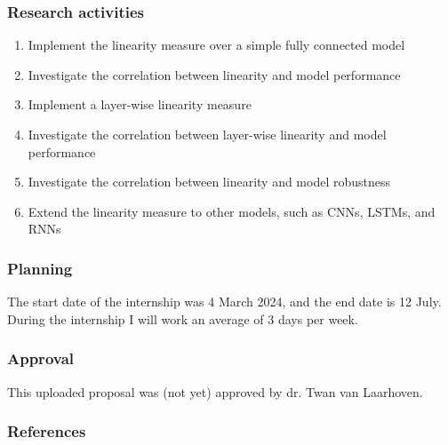 \documentclass[]{article}
\begin{document}
\subsubsection*{Research activities}
\begin{enumerate}
    \item Implement the linearity measure over a simple fully connected model
    \item Investigate the correlation between linearity and model performance
    \item Implement a layer-wise linearity measure
    \item Investigate the correlation between layer-wise linearity and model performance
    \item Investigate the correlation between linearity and model robustness
    \item Extend the linearity measure to other models, such as CNNs, LSTMs, and RNNs
\end{enumerate}

\subsubsection*{Planning}
The start date of the internship was 4 March 2024, and the end date is 12 July. During the internship I will work an average of 3 days per week. 

\subsubsection*{Approval}
This uploaded proposal was (not yet) approved by dr. Twan van Laarhoven.

\subsubsection*{References}
\printbibliography[heading=none]
\end{document}
